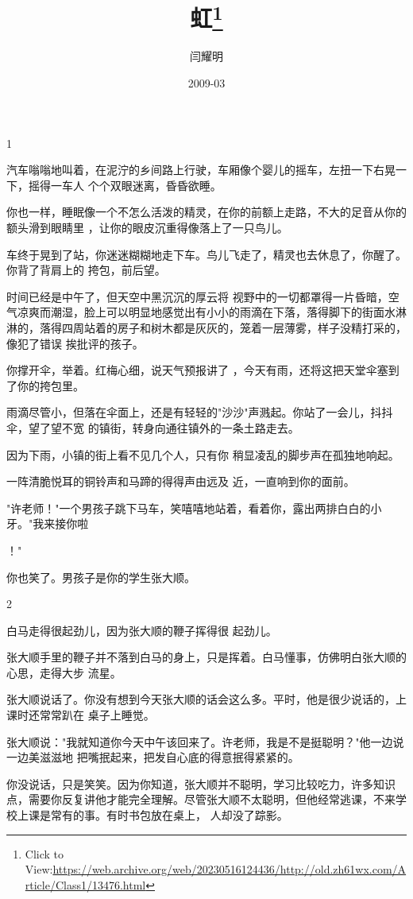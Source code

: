 \documentclass{article}
\title{虹\footnote{Click to View:\url{https://web.archive.org/web/20230516124436/http://old.zh61wx.com/Article/Class1/13476.html}}}
\author{闫耀明}
\date{2009-03}
\begin{document}

\maketitle


\Large


﻿1 

汽车嗡嗡地叫着，在泥泞的乡间路上行驶，车厢像个婴儿的摇车，左扭一下右晃一下，摇得一车人
个个双眼迷离，昏昏欲睡。 

你也一样，睡眠像一个不怎么活泼的精灵，在你的前额上走路，不大的足音从你的额头滑到眼睛里
，让你的眼皮沉重得像落上了一只鸟儿。 

车终于晃到了站，你迷迷糊糊地走下车。鸟儿飞走了，精灵也去休息了，你醒了。你背了背肩上的
挎包，前后望。 

时间已经是中午了，但天空中黑沉沉的厚云将
\newpage
视野中的一切都罩得一片昏暗，空气凉爽而潮湿，脸上可以明显地感觉出有小小的雨滴在下落，落得脚下的街面水淋淋的，落得四周站着的房子和树木都是灰灰的，笼着一层薄雾，样子没精打采的，像犯了错误
挨批评的孩子。 

你撑开伞，举着。红梅心细，说天气预报讲了
，今天有雨，还将这把天堂伞塞到了你的挎包里。 

雨滴尽管小，但落在伞面上，还是有轻轻的"沙沙"声溅起。你站了一会儿，抖抖伞，望了望不宽
的镇街，转身向通往镇外的一条土路走去。 

因为下雨，小镇的街上看不见几个人，只有你
稍显凌乱的脚步声在孤独地响起。 

一阵清脆悦耳的铜铃声和马蹄的得得声由远及
近，一直响到你的面前。 

"许老师！"一个男孩子跳下马车，笑嘻嘻地站着，看着你，露出两排白白的小牙。"我来接你啦
\newpage

！" 


你也笑了。男孩子是你的学生张大顺。 


2 

白马走得很起劲儿，因为张大顺的鞭子挥得很
起劲儿。 

张大顺手里的鞭子并不落到白马的身上，只是挥着。白马懂事，仿佛明白张大顺的心思，走得大步
流星。 

张大顺说话了。你没有想到今天张大顺的话会这么多。平时，他是很少说话的，上课时还常常趴在
桌子上睡觉。 

张大顺说："我就知道你今天中午该回来了。许老师，我是不是挺聪明？"他一边说一边美滋滋地
把嘴抿起来，把发自心底的得意抿得紧紧的。 

\newpage

你没说话，只是笑笑。因为你知道，张大顺并不聪明，学习比较吃力，许多知识点，需要你反复讲他才能完全理解。尽管张大顺不太聪明，但他经常逃课，不来学校上课是常有的事。有时书包放在桌上，
人却没了踪影。 
\end{document}
